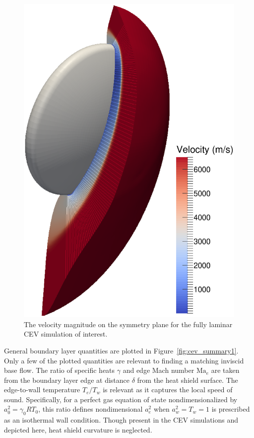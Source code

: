 \documentclass[letterpaper,11pt,nointlimits,reqno]{amsart}
\newcommand{\Mach}[1][]{\mbox{Ma}_{#1}}
\begin{document}
\begin{figure}
  \centering
  \includegraphics[height=0.55\textheight]{symplanenorm}
  \caption{
    \label{fig:cev_symplane}
    The velocity magnitude on the symmetry plane for the fully laminar
    CEV simulation of interest.
  }
\end{figure}

General boundary layer quantities are plotted in Figure~\ref{fig:cev_summary1}.
Only a few of the plotted quantities are relevant to finding a matching
inviscid base flow.  The ratio of specific heats $\gamma$ and edge Mach number
$\Mach[e]{}$ are taken from the boundary layer edge at distance $\delta$ from
the heat shield surface.  The edge-to-wall temperature $T_e/T_w$ is relevant as
it captures the local speed of sound.  Specifically, for a perfect gas equation
of state nondimensionalized by $a_0^2=\gamma_{0}RT_0$, this ratio defines
nondimensional $a_e^2$ when $a_w^2=T_w=1$ is prescribed as an isothermal wall
condition.  Though present in the CEV simulations and depicted here, heat
shield curvature is neglected.
\end{document}
